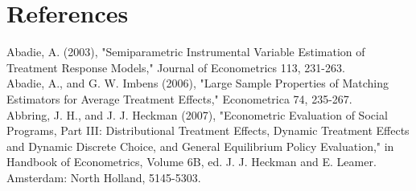 \documentclass[10pt]{article}
\begin{document}
\section*{References}
Abadie, A. (2003), "Semiparametric Instrumental Variable Estimation of Treatment Response Models," Journal of Econometrics 113, 231-263.\\
Abadie, A., and G. W. Imbens (2006), "Large Sample Properties of Matching Estimators for Average Treatment Effects," Econometrica 74, 235-267.\\
Abbring, J. H., and J. J. Heckman (2007), "Econometric Evaluation of Social Programs, Part III: Distributional Treatment Effects, Dynamic Treatment Effects and Dynamic Discrete Choice, and General Equilibrium Policy Evaluation," in Handbook of Econometrics, Volume 6B, ed. J. J. Heckman and E. Leamer. Amsterdam: North Holland, 5145-5303.
\end{document}
